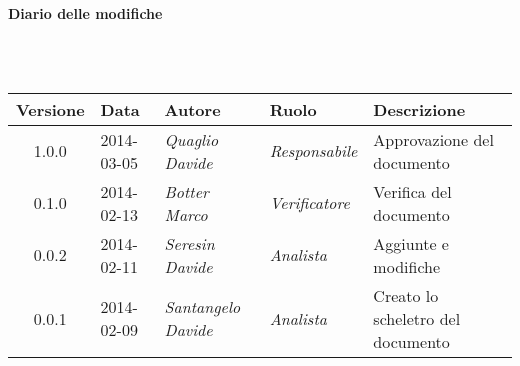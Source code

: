 \noindent\begin{Large}\textbf{Diario delle modifiche}\end{Large}\\
\\
\begin{small}
\begin{tabular}{|c|p{1.8cm}|p{2.8cm}|p{2.8cm}|p{3.5cm}|}
\hline
Versione & Data & Autore & Ruolo & Descrizione \\
\hline
\hline
1.0.0 & 2014-03-05 & 
\textit{Quaglio Davide} &
\textit{Responsabile} &  Approvazione del documento\\
\hline
0.1.0 & 2014-02-13 & 
\textit{Botter Marco} &
\textit{Verificatore} &  Verifica del documento\\
\hline
0.0.2 & 2014-02-11 & 
\textit{Seresin Davide} &
\textit{Analista} &  Aggiunte e modifiche\\
\hline
0.0.1 & 2014-02-09 & 
\textit{Santangelo Davide} &
\textit{Analista} &  Creato lo scheletro del documento\\
\hline
\end{tabular}\\
\end{small}
